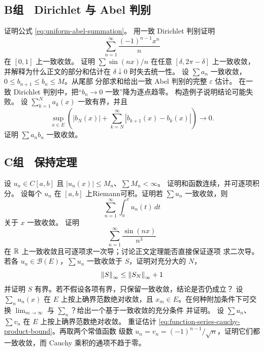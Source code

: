 \subsection*{B组　Dirichlet 与 Abel 判别}
\begin{enumerate}[label=\textbf{\thechapter.\arabic*.},resume]
 证明公式 \eqref{eq:uniform-abel-summation}。
 用一致 Dirichlet 判别证明
 \[
  \sum_{n=1}^\infty\frac{(-1)^{n-1}x^n}{n}
 \]
 在 \([0,1]\) 上一致收敛。
 证明 \(\sum\sin(nx)/n\) 在任意
 \([\delta,2\pi-\delta]\) 上一致收敛，并解释为什么正文的部分和估计在
 \(\delta\downarrow0\) 时失去统一性。
 设 \(\sum a_n\) 一致收敛，\(0\le b_{n+1}\le b_n\le M\)。从尾部
 分部求和给出一致 Abel 判别的完整 \(\varepsilon\) 估计。
 在一致 Dirichlet 判别中，把“\(b_n\to0\) 一致”降为逐点趋零。
 构造例子说明结论可能失败。
 设 \(\sum_{k=1}^Na_k(x)\) 一致有界，并且
 \[
  \sup_{x\in E}\left(
  |b_N(x)|+\sum_{k=N}^\infty|b_{k+1}(x)-b_k(x)|
  \right)\to0.
 \]
 证明 \(\sum a_nb_n\) 一致收敛。
\end{enumerate}

\subsection*{C组　保持定理}
\begin{enumerate}[label=\textbf{\thechapter.\arabic*.},resume]
 设 \(u_n\in C[a,b]\) 且 \(|u_n(x)|\le M_n\)、\(\sum M_n<\infty\)。
 证明和函数连续，并可逐项积分。
 设每个 \(u_n\) 在 \([a,b]\) 上Riemann可积。证明若 \(\sum u_n\) 一致收敛，则
 \[
  \sum_{n=1}^\infty\int_a^x u_n(t)\,dt
 \]
 关于 \(x\) 一致收敛。
 证明
 \[
  \sum_{n=1}^\infty\frac{\sin(nx)}{n^3}
 \]
 在 \(\mathbb{R}\) 上一致收敛且可逐项求一次导；讨论正文定理能否直接保证逐项
 求二次导。
 若各 \(u_n\in\mathcal B(E)\)，\(\sum u_n\) 一致收敛于 \(S\)，证明对充分大的 \(N\)，
 \[
  \left\lVert S\right\rVert_\infty
  \le \left\lVert S_N\right\rVert_\infty+1
 \]
 并证明 \(S\) 有界。若不假设各项有界，只保留一致收敛，结论是否仍成立？
 设 \(\sum_nu_n(x)\) 在 \(E\) 上按上确界范数绝对收敛，且
 \(x_m\in E\)。在何种附加条件下可交换
 \(\lim_{m\to\infty}\) 与 \(\sum_n\)？给出一个基于一致收敛的充分条件
 并证明。
 设 \(\sum u_n\)、\(\sum v_n\) 在 \(E\) 上按上确界范数绝对收敛。
 重证估计 \eqref{eq:function-series-cauchy-product-bound}。再取两个常值函数
 级数 \(u_n=v_n=(-1)^{n-1}/\sqrt n\)，证明它们都一致收敛，而 Cauchy
 乘积的通项不趋于零。
\end{enumerate}
